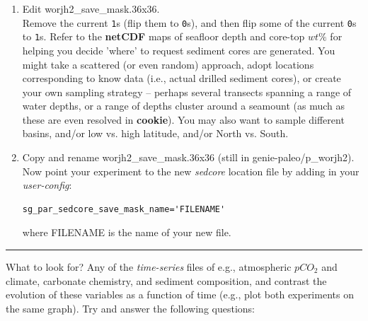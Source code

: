 \begin{enumerate}[noitemsep]

\vspace{1mm}
\item Edit \textsf{\footnotesize worjh2\_save\_mask.36x36}.
\\Remove the current \texttt{1}s (flip them to \texttt{0}s), and then flip some of the current \texttt{0}s to \texttt{1}s. Refer to the \textbf{netCDF} maps of seafloor depth and core-top $wt\%$ for helping you decide 'where' to request sediment cores are generated. You might take a scattered (or even random) approach, adopt locations corresponding to know data (i.e., actual drilled sediment cores), or create your own sampling strategy -- perhaps several transects spanning a range of water depths, or a range of depths cluster around a seamount (as much as these are even resolved in \textbf{cookie}). You may also want to sample different basins, and/or low vs. high latitude, and/or North vs. South.

\vspace{1mm}
\item Copy and rename \textsf{\footnotesize worjh2\_save\_mask.36x36} (still in \textsf{\footnotesize genie-paleo/p\_worjh2}). Now point your experiment to the new \textit{sedcore} location file by adding in your \textit{user-config}: 
\vspace{-1mm}\small\begin{verbatim}
sg_par_sedcore_save_mask_name='FILENAME'
\end{verbatim}\normalsize\vspace{-1mm}
where \textsf{\footnotesize FILENAME} is the name of your new file.

\end{enumerate}

\vspace{1mm}\noindent\rule{4cm}{0.1mm}\vspace{2mm}

\noindent What to look for? Any of the \textit{time-series} files of e.g., atmospheric $pCO_{2}$ and climate, carbonate chemistry, and sediment composition, and contrast the evolution of these variables as a function of time (e.g., plot both experiments on the same graph). Try and answer the following questions:

